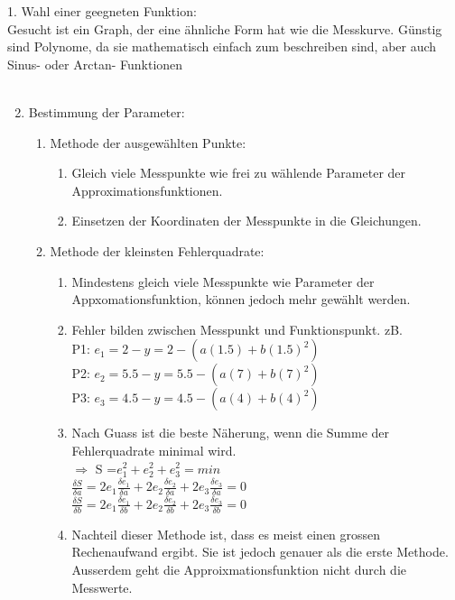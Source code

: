      	1. Wahl einer geegneten Funktion:\\
     	Gesucht ist ein Graph, der eine ähnliche Form
		hat wie die Messkurve. Günstig sind Polynome, da sie mathematisch einfach zum
		beschreiben sind, aber auch Sinus- oder Arctan- Funktionen	\\ 
        \\
     	\begin{enumerate}\setcounter{enumi}{1} 
        \item Bestimmung der Parameter:
          \begin{enumerate}
           \item Methode der ausgewählten Punkte:\\
          		\begin{enumerate}
                    \item Gleich viele Messpunkte wie frei zu wählende Parameter der
           			Approximationsfunktionen.
           			\item Einsetzen der Koordinaten der Messpunkte in die Gleichungen.
           		\end{enumerate}
           	\item Methode der kleinsten Fehlerquadrate:
           		\begin{enumerate}
                     \item Mindestens gleich viele Messpunkte wie Parameter der
           		Appxomationsfunktion, können jedoch mehr gewählt werden.
           		\item Fehler bilden zwischen Messpunkt und Funktionspunkt. zB.\\
           		P1:  $e_1=2-y=2-(a(1.5)+b(1.5)^2)$\\
           		P2:  $e_2=5.5-y=5.5-(a(7)+b(7)^2)$\\
           		P3:  $e_3=4.5-y=4.5-(a(4)+b(4)^2)$\\
           		\item Nach Guass ist die beste Näherung, wenn die Summe der
           		Fehlerquadrate minimal wird. \\
           		$\Longrightarrow$ S =$ e_1^2+e_2^2+e_3^2=min$\\
           		$\frac{\delta S}{\delta a}=
           		2 e_1 \frac{\delta e_1}{\delta a}+
           		2 e_2 \frac{\delta e_2}{\delta a}+
           		2 e_3 \frac{\delta e_3}{\delta a}=0$\\
           		$\frac{\delta S}{\delta b}=
           		2 e_1 \frac{\delta e_1}{\delta b}+
           		2 e_2 \frac{\delta e_2}{\delta b}+
           		2 e_3 \frac{\delta e_3}{\delta b}=0$\\
           		\item Nachteil dieser Methode ist, dass es meist einen grossen
           		Rechenaufwand ergibt. Sie ist jedoch genauer als die erste Methode.
           		Ausserdem geht die Approixmationsfunktion nicht durch die Messwerte.
           		\end{enumerate}
		\end{enumerate}
	\end{enumerate}
    
